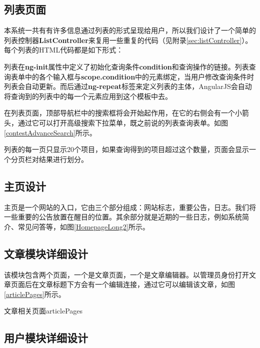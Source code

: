 \subsection{列表页面}
本系统一共有有许多信息通过列表的形式呈现给用户，所以我们设计了一个简单的列表控制器\textbf{ListController}来复用一些重复的代码（见附录\ref{sec:listController}）。每个列表的HTML代码都是如下形式：



列表在\textbf{ng-init}属性中定义了初始化查询条件\textbf{condition}和查询操作的链接。列表查询表单中的各个输入框与\textbf{scope.condition}中的元素绑定，当用户修改查询条件时列表会自动更新。而后通过\textbf{ng-repeat}标签来定义列表的主体，AngularJS会自动将查询到的列表中的每一个元素应用到这个模板中去。

在列表页面，顶部导航栏中的搜索框将会开始起作用，在它的右侧会有一个小箭头，通过它可以打开高级搜索下拉菜单，既之前说的列表查询表单。如图\ref{contestAdvanceSearch}所示。


列表的每一页只显示20个项目，如果查询得到的项目超过这个数量，页面会显示一个分页栏对结果进行划分。


\subsection{主页设计}
主页是一个网站的入口，它由三个部分组成：网站标志，重要公告，日志。我们将一些重要的公告放置在醒目的位置。其余部分就是近期的一些日志，例如系统简介、常见问答等，如图\ref{HomepageLong2}所示。

\subsection{文章模块详细设计}
该模块包含两个页面，一个是文章页面，一个是文章编辑器。以管理员身份打开文章页面后在文章标题下方会有一个编辑连接，通过它可以编辑该文章，如图\ref{articlePages}所示。

\begin{pics}[htbp]{文章相关页面}{articlePages}
\end{pics}

\subsection{用户模块详细设计}
